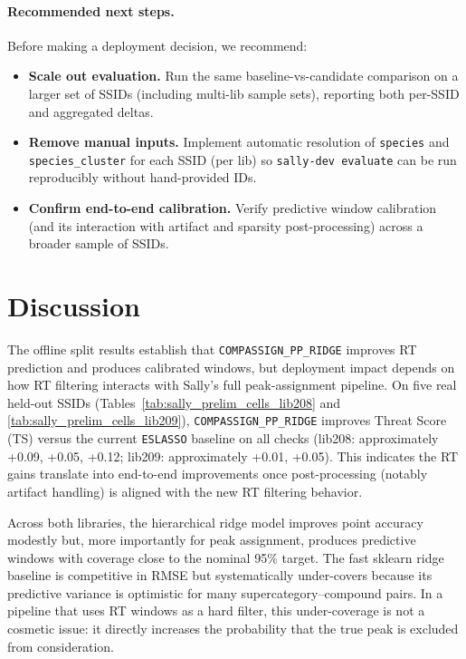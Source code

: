 \documentclass[11pt]{article}
\begin{document}
\paragraph{Recommended next steps.}
Before making a deployment decision, we recommend:
\begin{itemize}
  \item \textbf{Scale out evaluation.} Run the same baseline-vs-candidate comparison on a larger set of SSIDs (including
  multi-lib sample sets), reporting both per-SSID and aggregated deltas.
  \item \textbf{Remove manual inputs.} Implement automatic resolution of \texttt{species} and \texttt{species\_cluster}
  for each SSID (per lib) so \texttt{sally-dev evaluate} can be run reproducibly without hand-provided IDs.
  \item \textbf{Confirm end-to-end calibration.} Verify predictive window calibration (and its interaction with artifact
  and sparsity post-processing) across a broader sample of SSIDs.
\end{itemize}

\section{Discussion}

The offline split results establish that \texttt{COMPASSIGN\_PP\_RIDGE} improves RT prediction and produces calibrated
windows, but deployment impact depends on how RT filtering interacts with Sally's full peak-assignment pipeline. On five
real held-out SSIDs (Tables~\ref{tab:sally_prelim_cells_lib208} and \ref{tab:sally_prelim_cells_lib209}),
\nolinkurl{COMPASSIGN_PP_RIDGE} improves Threat Score (TS) versus the current \texttt{ESLASSO} baseline on all checks (lib208:
approximately +0.09, +0.05, +0.12; lib209: approximately +0.01, +0.05). This indicates the RT gains translate into
end-to-end improvements once post-processing (notably artifact handling) is aligned with the new RT filtering behavior.

Across both libraries, the hierarchical ridge model improves point accuracy modestly but, more importantly for peak
assignment, produces predictive windows with coverage close to the nominal 95\% target. The fast sklearn ridge baseline
is competitive in RMSE but systematically under-covers because its predictive variance is optimistic for many
supercategory--compound pairs. In a pipeline that uses RT windows as a hard filter, this under-coverage is not a cosmetic
issue: it directly increases the probability that the true peak is excluded from consideration.
\end{document}
